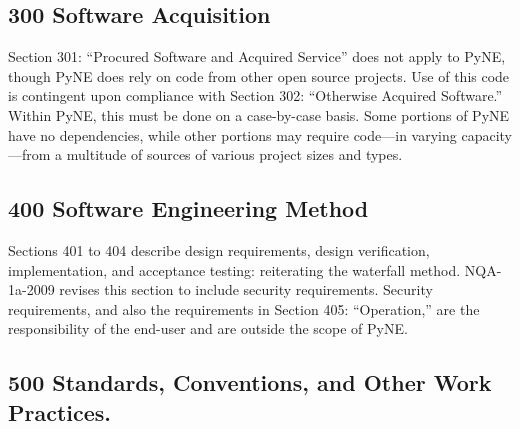 \documentclass{anstrans}
\begin{document}

\subsection{300 Software Acquisition}

Section 301: ``Procured Software and Acquired Service'' does not apply to PyNE,
though PyNE does rely on code from other open source projects. Use of this code
is contingent upon compliance with Section 302: ``Otherwise Acquired Software.''
Within PyNE, this must be done on a case-by-case basis. Some portions of PyNE
have no dependencies, while other portions may require code---in varying capacity---from a multitude of
sources of various project sizes and types.



\subsection{400 Software Engineering Method}

Sections 401 to 404 describe design requirements, design
verification, implementation, and acceptance testing: reiterating the
waterfall method. NQA-1a-2009 revises this section to include security
requirements. Security requirements, and also the requirements in Section 405:
``Operation,'' are the responsibility of the end-user and are outside the scope of
PyNE.


\subsection{500 Standards, Conventions, and Other Work Practices.}
\end{document}
